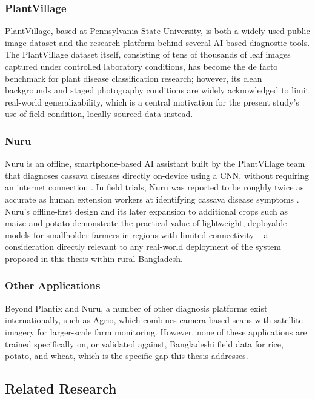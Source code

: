 \subsubsection{PlantVillage}
PlantVillage, based at Pennsylvania State University, is both a widely used public image dataset and the research platform behind several AI-based diagnostic tools. The PlantVillage dataset itself, consisting of tens of thousands of leaf images captured under controlled laboratory conditions, has become the de facto benchmark for plant disease classification research; however, its clean backgrounds and staged photography conditions are widely acknowledged to limit real-world generalizability, which is a central motivation for the present study's use of field-condition, locally sourced data instead.

\subsubsection{Nuru}
Nuru is an offline, smartphone-based AI assistant built by the PlantVillage team that diagnoses cassava diseases directly on-device using a CNN, without requiring an internet connection \cite{nuru_cgiar}. In field trials, Nuru was reported to be roughly twice as accurate as human extension workers at identifying cassava disease symptoms \cite{nuru_cgiar}. Nuru's offline-first design and its later expansion to additional crops such as maize and potato \cite{nuru_psu} demonstrate the practical value of lightweight, deployable models for smallholder farmers in regions with limited connectivity -- a consideration directly relevant to any real-world deployment of the system proposed in this thesis within rural Bangladesh.

\subsubsection{Other Applications}
Beyond Plantix and Nuru, a number of other diagnosis platforms exist internationally, such as Agrio, which combines camera-based scans with satellite imagery for larger-scale farm monitoring. However, none of these applications are trained specifically on, or validated against, Bangladeshi field data for rice, potato, and wheat, which is the specific gap this thesis addresses.

\subsection{Related Research}

